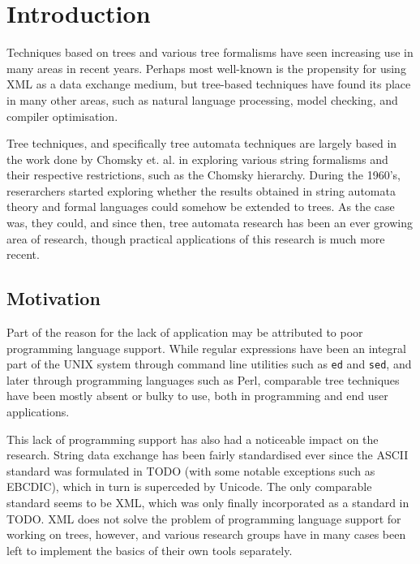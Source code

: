 



\section{Introduction}

Techniques based on trees and various tree formalisms have seen increasing
use in many areas in recent years. Perhaps most well-known is the
propensity for using XML as a data exchange medium, but tree-based
techniques have found its place in many other areas, such as natural
language processing, model checking, and compiler optimisation.

Tree techniques, and specifically tree automata techniques are largely
based in the work done by Chomsky et. al. in exploring various string
formalisms and their respective restrictions, such as the Chomsky
hierarchy. During the 1960's, reserarchers started exploring whether the
results obtained in string automata theory and formal languages could
somehow be extended to trees. As the case was, they could, and since then,
tree automata research has been an ever growing area of research, though
practical applications of this research is much more recent.

\subsection{Motivation}

Part of the reason for the lack of application may be attributed to poor
programming language support. While regular expressions have been an
integral part of the UNIX system through command line utilities such as
\texttt{ed} and \texttt{sed}, and later through programming languages such
as Perl, comparable tree techniques have been mostly absent or bulky to
use, both in programming and end user applications.

This lack of programming support has also had a noticeable impact on the
research. String data exchange has been fairly standardised ever since the
ASCII standard was formulated in TODO (with some notable exceptions such as
EBCDIC), which in turn is superceded by Unicode. The only comparable
standard seems to be XML, which was only finally incorporated as a standard
in TODO. XML does not solve the problem of programming language support for
working on trees, however, and various research groups have in many cases
been left to implement the basics of their own tools separately. 

